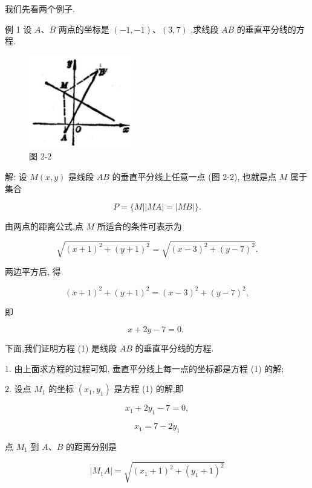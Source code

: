 \documentclass[lang=cn,newtx,10pt,scheme=chinese]{elegantbook}
\begin{document}
我们先看两个例子.

例 1 设 \(A\text{、}B\) 两点的坐标是 \(\left( {-1, - 1}\right) \text{、}\left( {3,7}\right)\) ,求线段 \({AB}\) 的垂直平分线的方程.

\begin{figure}[h]
  \centering
  \includegraphics[max width=0.4\textwidth]{images/01912cc2-ffb6-728e-9ae7-b113ff05c64b_67_837628.jpg}
  \caption{图 2-2}
\end{figure}



解: 设 \(M\left( {x,y}\right)\) 是线段 \({AB}\) 的垂直平分线上任意一点 (图 2-2), 也就是点 \(M\) 属于集合

\[
  P = \{ M\left| \right| {MA}\left| = \right| {MB} \mid \} .
\]

由两点的距离公式,点 \(M\) 所适合的条件可表示为

\[
  \sqrt{{\left( x + 1\right) }^{2} + {\left( y + 1\right) }^{2}} = \sqrt{{\left( x - 3\right) }^{2} + {\left( y - 7\right) }^{2}}.
\]

两边平方后, 得

\[
    {\left( x + 1\right) }^{2} + {\left( y + 1\right) }^{2} = {\left( x - 3\right) }^{2} + {\left( y - 7\right) }^{2},
\]

即

\[
  x + {2y} - 7 = 0\text{. } \tag{1}
\]

下面,我们证明方程 (1) 是线段 \({AB}\) 的垂直平分线的方程.

1. 由上面求方程的过程可知, 垂直平分线上每一点的坐标都是方程 (1) 的解;

2. 设点 \({M}_{1}\) 的坐标 \(\left( {{x}_{1},{y}_{1}}\right)\) 是方程 (1) 的解,即

\[
    {x}_{1} + 2{y}_{1} - 7 = 0,
\]

\[
    {x}_{1} = 7 - 2{y}_{1}
\]

点 \({M}_{1}\) 到 \(A\text{、}B\) 的距离分别是

\[
  \left| {{M}_{1}A}\right| = \sqrt{{\left( {x}_{1} + 1\right) }^{2} + {\left( {y}_{1} + 1\right) }^{2}}
\]
\end{document}
